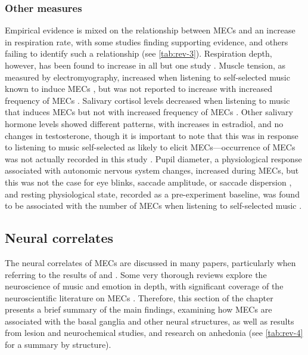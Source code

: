 \subsubsection{Other measures}

Empirical evidence is mixed on the relationship between MECs and an increase in respiration rate, with some studies finding supporting evidence, and others failing to identify such a relationship (see \autoref{tab:rev-3}). Respiration depth, however, has been found to increase in all \parencite{benedek2011, blood2001, grewe2009a} but one study \parencite{mori2017}. Muscle tension, as measured by electromyography, increased when listening to self-selected music known to induce MECs \parencite{blood2001}, but was not reported to increase with increased frequency of MECs \parencite{rickard2004}. Salivary cortisol levels decreased when listening to music that induces MECs \parencite{fukui2013} but not with increased frequency of MECs \parencite{rickard2004}. Other salivary hormone levels showed different patterns, with increases in estradiol, and no changes in testosterone, though it is important to note that this was in response to listening to music self-selected as likely to elicit MECs---occurrence of MECs was not actually recorded in this study \parencite{fukui2013}. Pupil diameter, a physiological response associated with autonomic nervous system changes, increased during MECs, but this was not the case for eye blinks, saccade amplitude, or saccade dispersion \parencite{laeng2016}, and resting physiological state, recorded as a pre-experiment baseline, was found to be associated with the number of MECs when listening to self-selected music \parencite{mori2014b}.



\subsection{Neural correlates}
\label{se:rev-results-5}

The neural correlates of MECs are discussed in many papers, particularly when referring to the results of \textcite{blood2001} and \textcite{salimpoor2011}. Some very thorough reviews explore the neuroscience of music and emotion in depth, with significant coverage of the neuroscientific literature on MECs \parencite[e.g.,][]{archie2013, brattico2013a, brattico2013b, chanda2013, habibi2014, koelsch2010, koelsch2014, salimpoor2013, schaefer2017, zatorre2003, zatorre2013, zatorre2015}. Therefore, this section of the chapter presents a brief summary of the main findings, examining how MECs are associated with the basal ganglia and other neural structures, as well as results from lesion and neurochemical studies, and research on anhedonia (see \autoref{tab:rev-4} for a summary by structure).

